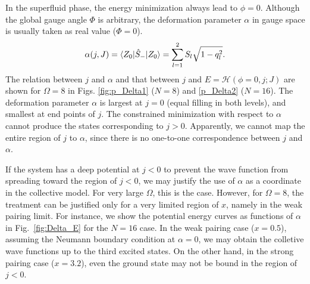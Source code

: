 \documentclass[%
superscriptaddress,
preprint,
showpacs,
nofootinbib,
amsmath,amssymb,
prc,
floatfix ]%
{revtex4-1}
\begin{document}
In the superfluid phase, the energy minimization always lead to $\phi=0$.
Although the global gauge angle $\Phi$ is arbitrary,
the deformation parameter $\alpha$ in gauge space is usually taken as real value ($\Phi=0$).
\begin{align}
\alpha(j,J) = \braket{Z_0|\hat{S}_-|Z_0} %
	= \sum_{l=1}^2 S_l\sqrt{1-q_l^2} . %
 \label{Delta_BCS}
\end{align}
The relation between $j$ and $\alpha$ 
and that between $j$ and $E=\mathcal{H}(\phi=0,j;J)$
are shown for $\Omega=8$
in Figs. \ref{fig:p_Delta1} ($N=8$) and \ref{p_Delta2} ($N=16$).
The deformation parameter $\alpha$ is largest at $j=0$ (equal filling in both levels),
and smallest at end points of $j$.
The constrained minimization with respect to $\alpha$ cannot 
produce the states corresponding to $j>0$.
Apparently, we cannot map the entire region of $j$ to $\alpha$,
since there is no one-to-one correspondence between $j$ and $\alpha$.

If the system has a deep potential at $j<0$ to prevent the wave function
from spreading toward the region of $j<0$,
we may justify the use of $\alpha$ as a coordinate in
the collective model.
For very large $\Omega$, this is the case.
However, for $\Omega=8$, the treatment can be justified only for
a very limited region of $x$, namely in the weak pairing limit.
For instance, we show the potential energy curves as functions of $\alpha$
in Fig.~\ref{fig:Delta_E} for the $N=16$ case.
In the weak pairing case ($x=0.5$),
assuming the Neumann boundary condition at $\alpha=0$,
we may obtain the colletive wave functions up to the third excited states.
On the other hand, in the strong pairing case ($x=3.2$), 
even the ground state may not be bound in the region of $j<0$.
\end{document}
